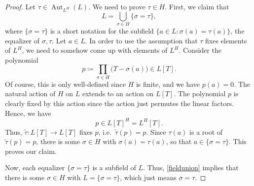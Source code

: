 \documentclass[10pt,a4paper]{amsart}
\DeclareMathOperator{\Aut}{Aut}
\begin{document}
\begin{proof}
Let $\tau \in \Aut_{L^H}(L)$. We need to prove $\tau \in H$. First, we claim that
\[L = \bigcup_{\sigma \in H} \{\sigma = \tau\},\]
where $\{\sigma = \tau\}$ is a short notation for the subfield $\{a \in L : \sigma(a) = \tau(a)\}$, the equalizer of $\sigma,\tau$. Let $a \in L$. In order to use the assumption that $\tau$ fixes elements of $L^H$, we need to somehow come up with elements of $L^H$. Consider the polynomial
\[p \coloneqq \prod_{\sigma \in H} \bigl(T - \sigma(a)\bigr) \in L[T].\]
Of course, this is only well-defined since $H$ is finite, and we have $p(a)=0$. The natural action of $H$ on $L$ extends to an action on $L[T]$. The polynomial $p$ is clearly fixed by this action since the action just permutes the linear factors. Hence, we have
\[p \in L[T]^H = L^H[T].\]
Thus, $\tilde{\tau} : L[T] \to L[T]$ fixes $p$, i.e.\ $\tilde{\tau}(p)=p$. Since $\tau(a)$ is a root of $\tilde{\tau}(p)=p$, there is some $\sigma \in H$ with $\sigma(a)=\tau(a)$, so that $a \in \{\sigma = \tau\}$. This proves our claim.

Now, each equalizer $\{\sigma = \tau\}$ is a subfield of $L$. Thus, \cref{fieldunion} implies that there is some $\sigma \in H$ with $L = \{\sigma = \tau\}$, which just means $\sigma = \tau$.
\end{proof}
\end{document}
